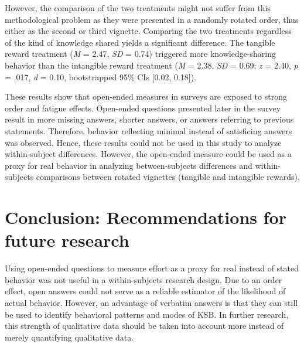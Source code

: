 \documentclass[twocolumn, serif, empirical, authordate]{jote-article}
\begin{document}
However, the comparison of the two treatments might not suffer from this methodological problem as they were presented in a randomly rotated order, thus either as the second or third vignette. Comparing the two treatments regardless of the kind of knowledge shared yields a significant difference. The tangible reward treatment (\emph{M} = 2.47, \emph{SD} = 0.74) triggered more knowledge-sharing behavior than the intangible reward treatment (\emph{M} = 2.38, \emph{SD} = 0.69; \emph{z} = 2.40, \emph{p} = .017, \emph{d} = 0.10, bootstrapped 95\% CIs {[}0.02, 0.18{]}).

These results show that open-ended measures in surveys are exposed to strong order and fatigue effects. Open-ended questions presented later in the survey result in more missing answers, shorter answers, or answers referring to previous statements. Therefore, behavior reflecting minimal instead of satisficing answers was observed. Hence, these results could not be used in this study to analyze within-subject differences. However, the open-ended measure could be used as a proxy for real behavior in analyzing between-subjects differences and within-subjects comparisons between rotated vignettes (tangible and intangible rewards).


\section*{Conclusion: Recommendations for future research}

Using open-ended questions to measure effort as a proxy for real instead of stated behavior was not useful in a within-subjects research design.
Due to an order effect, open answers could not serve as a reliable estimator of the likelihood of actual behavior. However, an advantage of verbatim answers is that they can still be used to identify behavioral patterns and modes of KSB. In further research, this strength of qualitative data should be taken into account more instead of merely quantifying qualitative data.
\end{document}
